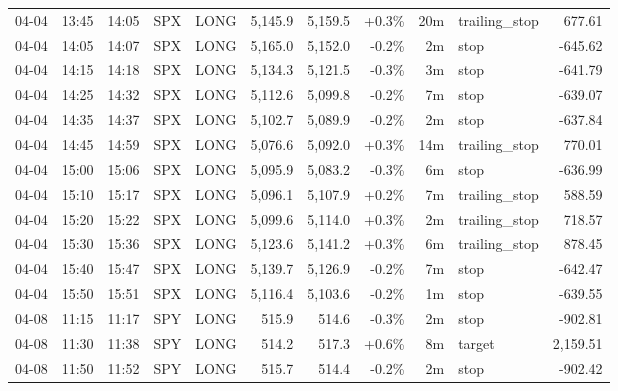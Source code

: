 \documentclass[11pt,a4paper,twoside]{article}
\begin{document}
\begin{center}
\begin{longtable}{>{\color{txtmain}}l l l l l r r r r >{\color{txtmain}}l r}
04-04 & 13:45 & 14:05 & SPX & LONG & 5,145.9 & 5,159.5 & \textcolor{wingreen}{+0.3\%} & 20m & trailing\_stop & \textcolor{wingreen}{677.61} \\
04-04 & 14:05 & 14:07 & SPX & LONG & 5,165.0 & 5,152.0 & \textcolor{lossred}{-0.2\%} & 2m & stop & \textcolor{lossred}{-645.62} \\
04-04 & 14:15 & 14:18 & SPX & LONG & 5,134.3 & 5,121.5 & \textcolor{lossred}{-0.3\%} & 3m & stop & \textcolor{lossred}{-641.79} \\
04-04 & 14:25 & 14:32 & SPX & LONG & 5,112.6 & 5,099.8 & \textcolor{lossred}{-0.2\%} & 7m & stop & \textcolor{lossred}{-639.07} \\
04-04 & 14:35 & 14:37 & SPX & LONG & 5,102.7 & 5,089.9 & \textcolor{lossred}{-0.2\%} & 2m & stop & \textcolor{lossred}{-637.84} \\
04-04 & 14:45 & 14:59 & SPX & LONG & 5,076.6 & 5,092.0 & \textcolor{wingreen}{+0.3\%} & 14m & trailing\_stop & \textcolor{wingreen}{770.01} \\
04-04 & 15:00 & 15:06 & SPX & LONG & 5,095.9 & 5,083.2 & \textcolor{lossred}{-0.3\%} & 6m & stop & \textcolor{lossred}{-636.99} \\
04-04 & 15:10 & 15:17 & SPX & LONG & 5,096.1 & 5,107.9 & \textcolor{wingreen}{+0.2\%} & 7m & trailing\_stop & \textcolor{wingreen}{588.59} \\
04-04 & 15:20 & 15:22 & SPX & LONG & 5,099.6 & 5,114.0 & \textcolor{wingreen}{+0.3\%} & 2m & trailing\_stop & \textcolor{wingreen}{718.57} \\
04-04 & 15:30 & 15:36 & SPX & LONG & 5,123.6 & 5,141.2 & \textcolor{wingreen}{+0.3\%} & 6m & trailing\_stop & \textcolor{wingreen}{878.45} \\
04-04 & 15:40 & 15:47 & SPX & LONG & 5,139.7 & 5,126.9 & \textcolor{lossred}{-0.2\%} & 7m & stop & \textcolor{lossred}{-642.47} \\
04-04 & 15:50 & 15:51 & SPX & LONG & 5,116.4 & 5,103.6 & \textcolor{lossred}{-0.2\%} & 1m & stop & \textcolor{lossred}{-639.55} \\
04-08 & 11:15 & 11:17 & SPY & LONG & 515.9 & 514.6 & \textcolor{lossred}{-0.3\%} & 2m & stop & \textcolor{lossred}{-902.81} \\
04-08 & 11:30 & 11:38 & SPY & LONG & 514.2 & 517.3 & \textcolor{wingreen}{+0.6\%} & 8m & target & \textcolor{wingreen}{2,159.51} \\
04-08 & 11:50 & 11:52 & SPY & LONG & 515.7 & 514.4 & \textcolor{lossred}{-0.2\%} & 2m & stop & \textcolor{lossred}{-902.42} \\

\end{longtable}
\end{center}
\end{document}
